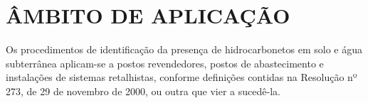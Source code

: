 \chapter{ÂMBITO DE APLICAÇÃO}
	
Os procedimentos de identificação da presença de
hidrocarbonetos em solo e água subterrânea aplicam-se a
postos revendedores, postos de abastecimento e instalações
de sistemas retalhistas, conforme definições contidas na
Resolução nº 273, de 29 de novembro de 2000, ou outra que
vier a sucedê-la.